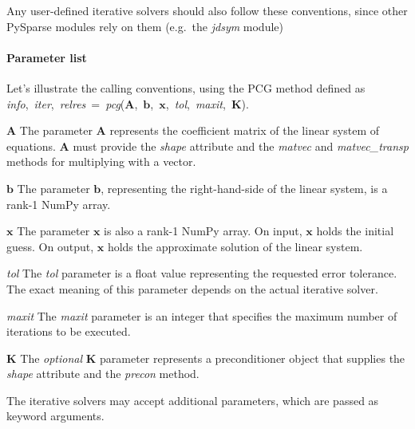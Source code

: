\documentclass[a4paper]{article}
\newcommand{\mat}[1]{\ensuremath{\boldsymbol{#1}}}
\newcommand{\vect}[1]{\ensuremath{\mathbf{#1}}}
\newenvironment{arglist} {\begin{list}{}{\setlength{\leftmargin}{4em}\setlength{\itemsep}{0cm}\setlength{\labelwidth}{3em}}}
  {\end{list}}
\begin{document}
Any user-defined iterative solvers should also follow these
conventions, since other PySparse modules rely on them (e.g.\ the
\textit{jdsym} module)

\paragraph{Parameter list}
%
Let's illustrate the calling conventions, using the PCG method
defined as \mbox{\textit{info}, \textit{iter}, \textit{relres} =
  \textit{pcg}($\mat{A}$, $\vect{b}$, $\vect{x}$, \textit{tol},
  \textit{maxit}, $\mat{K}$)}.
%
\begin{arglist}
\item[$\mat{A}$] The parameter $\mat{A}$ represents the coefficient
  matrix of the linear system of equations.  $\mat{A}$ must provide
  the \textit{shape} attribute and the \textit{matvec} and
  \textit{matvec\_transp} methods for multiplying with a vector.
\item[$\vect{b}$] The parameter $\vect{b}$, representing the
  right-hand-side of the linear system, is a rank-1 NumPy array.
\item[$\vect{x}$] The parameter $\vect{x}$ is also a rank-1 NumPy
array. On input, $\vect{x}$ holds the initial guess. On output,
$\vect{x}$ holds the approximate solution of the linear system.
\item[\textit{tol}] The \textit{tol} parameter is a float value
  representing the requested error tolerance. The exact meaning of
  this parameter depends on the actual iterative solver.
\item[\textit{maxit}] The \textit{maxit} parameter is an integer that
  specifies the maximum number of iterations to be executed.
\item[$\mat{K}$] The \emph{optional} $\mat{K}$ parameter represents a
  preconditioner object that supplies the \textit{shape} attribute and
  the \textit{precon} method.
\end{arglist}
The iterative solvers may accept additional parameters, which are
passed as keyword arguments.

\end{document}
